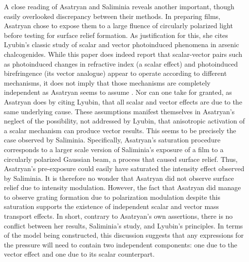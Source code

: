 \documentclass[twocolumn,showpacs,preprintnumbers,amsmath,amssymb]{revtex4}
\begin{document}
A close reading of Asatryan and Saliminia reveals another important, though easily
overlooked discrepancy between their methods. In preparing films, Asatryan chose to
expose them to a large fluence of circularly polarized light before testing for surface
relief formation. As justification for this, she cites Lyubin's classic study of scalar
and vector photoinduced phenomena in arsenic chalcogenides. While this paper does indeed
report that scalar-vector pairs such as photoinduced changes in refractive index (a
scalar effect) and photoinduced birefringence (its vector analogue) appear to operate
according to different mechanisms, it does not imply that those mechanisms are completely
independent as Asatryan seems to assume \cite{lyubin89}. Nor can one take for granted, as
Asatryan does by citing Lyubin, that all scalar and vector effects are due to the same
underlying cause. These assumptions manifest themselves in Asatryan's neglect of the
possibility, not addressed by Lyubin, that anisotropic activation of a scalar mechanism
can produce vector results. This seems to be precisely the case observed by Saliminia.
Specifically, Asatryan's saturation procedure corresponds to a larger scale version of
Saliminia's exposure of a film to a circularly polarized Gaussian beam, a process that
caused surface relief. Thus, Asatryan's pre-exposure could easily have saturated the
intensity effect observed by Saliminia. It is therefore no wonder that Asatryan did not
observe surface relief due to intensity modulation. However, the fact that Asatryan did
manage to observe grating formation due to polarization modulation despite this
saturation supports the existence of independent scalar and vector mass transport
effects. In short, contrary to Asatryan's own assertions, there is no conflict between
her results, Saliminia's study, and Lyubin's principles. In terms of the model being
constructed, this discussion suggests that any expressions for the pressure will need to
contain two independent components: one due to the vector effect and one due to its
scalar counterpart.
\end{document}
